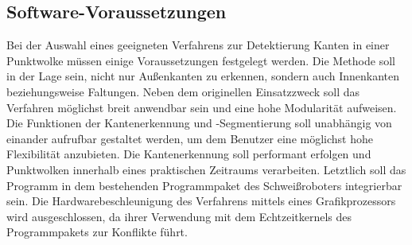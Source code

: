 \subsection{Software-Voraussetzungen}\label{soft_voraus}
Bei der Auswahl eines geeigneten Verfahrens zur Detektierung Kanten in einer Punktwolke müssen einige Voraussetzungen festgelegt werden. Die Methode soll in der Lage sein, nicht nur Außenkanten zu erkennen, sondern auch Innenkanten beziehungsweise Faltungen. Neben dem originellen Einsatzzweck soll das Verfahren möglichst breit anwendbar sein und eine hohe Modularität aufweisen. Die Funktionen der Kantenerkennung und -Segmentierung soll unabhängig von einander aufrufbar gestaltet werden, um dem Benutzer eine möglichst hohe Flexibilität anzubieten. Die Kantenerkennung soll performant erfolgen und Punktwolken innerhalb eines praktischen Zeitraums verarbeiten. Letztlich soll das Programm in dem bestehenden Programmpaket des Schweißroboters integrierbar sein. Die Hardwarebeschleunigung des Verfahrens mittels eines Grafikprozessors wird ausgeschlossen, da ihrer Verwendung mit dem Echtzeitkernels des Programmpakets zur Konflikte führt. 

